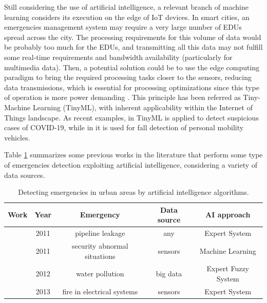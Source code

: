 \begin{refsection}
Still considering the use of artificial intelligence, a relevant branch of machine learning considers its execution on the edge of IoT devices. In smart cities, an emergencies management system may require a very large number of EDUs spread across the city. The processing requirements for this volume of data would be probably too much for the EDUs, and transmitting all this data may not fulfill some real-time requirements and bandwidth availability (particularly for multimedia data). Then, a potential solution could be to use the edge computing paradigm to bring the required processing tasks closer to the sensors, reducing data transmissions, which is essential for processing optimizations since this type of operation is more power demanding \cite{TinyMachinePavementAnomalies}. This principle has been referred as Tiny-Machine Learning (TinyML), with inherent applicability within the Internet of Things landscape. As recent examples, in \cite{TinyMachineCovid} TinyML is applied to detect suspicious cases of COVID-19, while in \cite{TinyMachineFall} it is used for fall detection of personal mobility vehicles.

Table \ref{Tab:ai} summarizes some previous works in the literature that perform some type of emergencies detection exploiting artificial intelligence, considering a variety of data sources.

\begin{table}
\centering
\caption{Detecting emergencies in urban areas by artificial intelligence algorithms.}
\label{Tab:ai}
\begin{tabular}{|c|c|c|c|c|}
    \textbf{Work} & \textbf{Year} & \textbf{Emergency} & \textbf{Data source} & \textbf{AI approach}\\

    \hline
    \citeauthor{ExpertLeakage1} \cite{ExpertLeakage1} & 2011 & pipeline leakage & any & Expert System \\
    
    \hline
    \citeauthor{AudioMachine} \cite{AudioMachine} & 2011 & security abnormal situations & sensors & Machine Learning \\
    
    \hline
    
    \citeauthor{FuzzyWater1} \cite{FuzzyWater1} & 2012 & water pollution & big data & Expert Fuzzy System \\
    
    \hline
    \citeauthor{FuzzyFire3} \cite{FuzzyFire3} & 2013 & fire in electrical systems & sensors & Expert System \\
    

\end{tabular}
\end{table}
\end{refsection}
